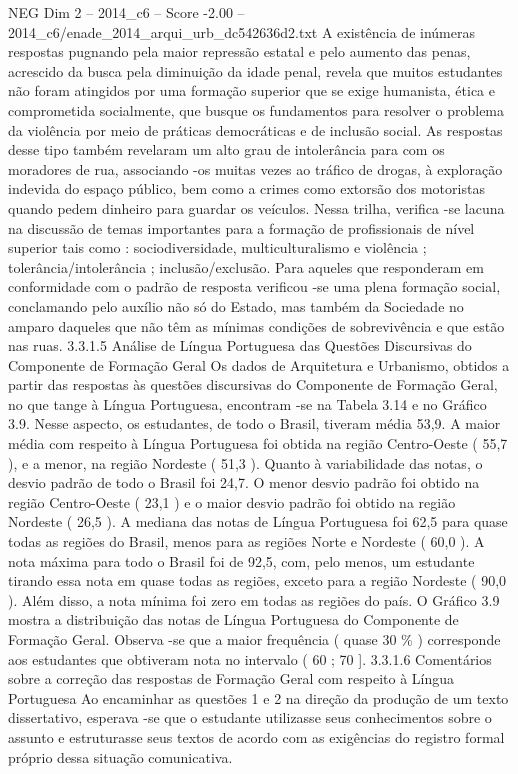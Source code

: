 \begin{textsample}{NEG Dim 2 – 2014\_c6 – Score -2.00 – 2014\_c6/enade\_2014\_arqui\_urb\_dc542636d2.txt}
A existência de inúmeras respostas pugnando pela maior repressão estatal e pelo aumento das penas, acrescido da busca pela diminuição da idade penal, revela que muitos estudantes não foram atingidos por uma formação superior que se exige humanista, ética e comprometida socialmente, que busque os fundamentos para resolver o problema da violência por meio de práticas democráticas e de inclusão social.
As respostas desse tipo também revelaram um alto grau de intolerância para com os moradores de rua, associando -os muitas vezes ao tráfico de drogas, à exploração indevida do espaço público, bem como a crimes como extorsão dos motoristas quando pedem dinheiro para guardar os veículos.
Nessa trilha, verifica -se lacuna na discussão de temas importantes para a formação de profissionais de nível superior tais como : sociodiversidade, multiculturalismo e violência ; tolerância/intolerância ; inclusão/exclusão.
Para aqueles que responderam em conformidade com o padrão de resposta verificou -se uma plena formação social, conclamando pelo auxílio não só do Estado, mas também da Sociedade no amparo daqueles que não têm as mínimas condições de sobrevivência e que estão nas ruas. 3.3.1.5 Análise de Língua Portuguesa das Questões Discursivas do Componente de Formação Geral Os dados de Arquitetura e Urbanismo, obtidos a partir das respostas às questões discursivas do Componente de Formação Geral, no que tange à Língua Portuguesa, encontram -se na Tabela 3.14 e no Gráfico 3.9.
Nesse aspecto, os estudantes, de todo o Brasil, tiveram média 53,9.
A maior média com respeito à Língua Portuguesa foi obtida na região Centro-Oeste ( 55,7 ), e a menor, na região Nordeste ( 51,3 ).
Quanto à variabilidade das notas, o desvio padrão de todo o Brasil foi 24,7.
O menor desvio padrão foi obtido na região Centro-Oeste ( 23,1 ) e o maior desvio padrão foi obtido na região Nordeste ( 26,5 ).
A mediana das notas de Língua Portuguesa foi 62,5 para quase todas as regiões do Brasil, menos para as regiões Norte e Nordeste ( 60,0 ).
A nota máxima para todo o Brasil foi de 92,5, com, pelo menos, um estudante tirando essa nota em quase todas as regiões, exceto para a região Nordeste ( 90,0 ).
Além disso, a nota mínima foi zero em todas as regiões do país.
O Gráfico 3.9 mostra a distribuição das notas de Língua Portuguesa do Componente de Formação Geral.
Observa -se que a maior frequência ( quase 30 \% ) corresponde aos estudantes que obtiveram nota no intervalo ( 60 ; 70 ]. 3.3.1.6 Comentários sobre a correção das respostas de Formação Geral com respeito à Língua Portuguesa Ao encaminhar as questões 1 e 2 na direção da produção de um texto dissertativo, esperava -se que o estudante utilizasse seus conhecimentos sobre o assunto e estruturasse seus textos de acordo com as exigências do registro formal próprio dessa situação comunicativa.

\end{textsample}
